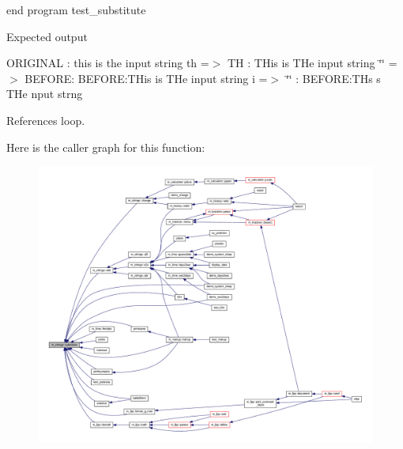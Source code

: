 end program test\+\_\+substitute

Expected output

O\+R\+I\+G\+I\+N\+AL \+: this is the input string th =$>$ TH \+: T\+His is T\+He input string \char`\"{}\char`\"{} =$>$ B\+E\+F\+O\+RE\+: B\+E\+F\+O\+RE\+:T\+His is T\+He input string i =$>$ \char`\"{}\char`\"{} \+: B\+E\+F\+O\+RE\+:T\+Hs s T\+He nput strng 

References loop.

Here is the caller graph for this function\+:
\nopagebreak
\begin{figure}[H]
\begin{center}
\leavevmode
\includegraphics[width=350pt]{namespacem__strings_ab84a4b7c2be211433c2d1b435a87fa32_icgraph}
\end{center}
\end{figure}
\mbox{\label{namespacem__strings_aaee428861205782e002f5e7e8fb002f0}} 
